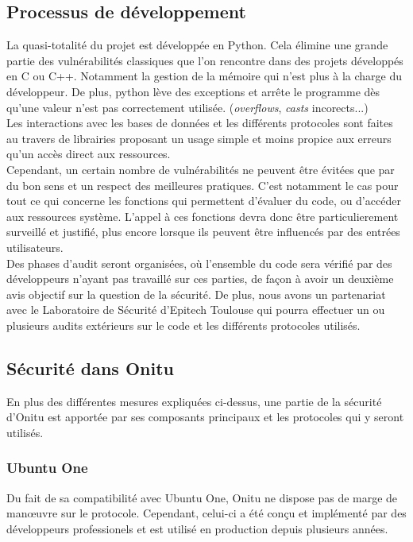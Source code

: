 \subsection{Processus de développement}

La quasi-totalité du projet est développée en Python. Cela élimine une grande partie des vulnérabilités classiques que l'on rencontre dans des projets développés en C ou C++. Notamment la gestion de la mémoire qui n'est plus à la charge du développeur. De plus, python lève des exceptions et arrête le programme dès qu'une valeur n'est pas correctement utilisée. (\textit{overflows}, \textit{casts} incorects...)\\

Les interactions avec les bases de données et les différents protocoles sont faites au travers de librairies proposant un usage simple et moins propice aux erreurs qu'un accès direct aux ressources.\\

Cependant, un certain nombre de vulnérabilités ne peuvent être évitées que par du bon sens et un respect des meilleures pratiques. C'est notamment le cas pour tout ce qui concerne les fonctions qui permettent d'évaluer du code, ou d'accéder aux ressources système. L'appel à ces fonctions devra donc être particulierement surveillé et justifié, plus encore lorsque ils peuvent être influencés par des entrées utilisateurs.\\

Des phases d'audit seront organisées, où l'ensemble du code sera vérifié par des développeurs n'ayant pas travaillé sur ces parties, de façon à avoir un deuxième avis objectif sur la question de la sécurité. De plus, nous avons un partenariat avec le Laboratoire de Sécurité d'Epitech Toulouse qui pourra effectuer un ou plusieurs audits extérieurs sur le code et les différents protocoles utilisés.

\subsection{Sécurité dans Onitu}

En plus des différentes mesures expliquées ci-dessus, une partie de la sécurité d'Onitu est apportée par ses composants principaux et les protocoles qui y seront utilisés.

\subsubsection{Ubuntu One}
Du fait de sa compatibilité avec Ubuntu One, Onitu ne dispose pas de marge de manœuvre sur le protocole. Cependant, celui-ci a été conçu et implémenté par des développeurs professionels et est utilisé en production depuis plusieurs années.\\

